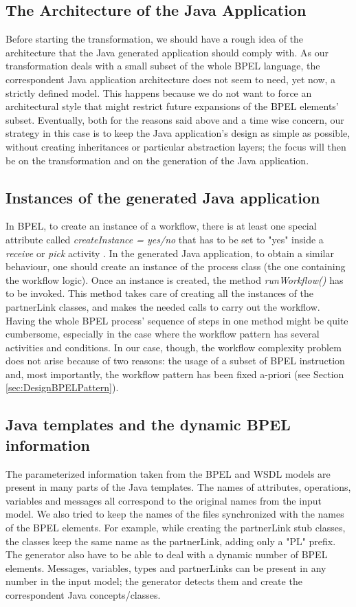 \subsection{The Architecture of the Java Application}
\label{sec:JavaArchitecStruct}
Before starting the transformation, we should have a rough idea of the architecture that the Java generated application should comply with.
As our transformation deals with a small subset of the whole BPEL language, the correspondent Java application architecture does not seem to need, yet now, a strictly defined model. This happens because we do not want to force an architectural style that might restrict future expansions of the BPEL elements' subset.
Eventually, both for the reasons said above and a time wise concern, our strategy in this case is to keep the Java application's design as simple as possible, without creating inheritances or particular abstraction layers; the focus will then be on the transformation and on the generation of the Java application.

\subsection{Instances of the generated Java application}
\label{sec:JavaAppRunnable}
In BPEL, to create an instance of a workflow, there is at least one special attribute called \textit{createInstance = yes/no} that has to be set to "yes" inside a \textit{receive} or \textit{pick} activity \cite{BPEL-oasis}. In the generated Java application, to obtain a similar behaviour, one should create an instance of the process class (the one containing the workflow logic). Once an instance is created, the method \textit{runWorkflow()} has to be invoked. This method takes care of creating all the instances of the partnerLink classes, and makes the needed calls to carry out the workflow.
Having the whole BPEL process' sequence of steps in one method might be quite cumbersome, especially in the case where the workflow pattern has several activities and conditions. In our case, though, the workflow complexity problem does not arise because of two reasons: the usage of a subset of BPEL instruction and, most importantly, the workflow pattern has been fixed a-priori (see Section \ref{sec:DesignBPELPattern}). 

\subsection{Java templates and the dynamic BPEL information}
\label{TemplatesDynamicInfos}
The parameterized information taken from the BPEL and WSDL models are present in many parts of the Java templates. The names of attributes, operations, variables and messages all correspond to the original names from the input model. 
We also tried to keep the names of the files synchronized with the names of the BPEL elements. For example, while creating the partnerLink stub classes, the classes keep the same name as the partnerLink, adding only a "PL" prefix. 
The generator also have to be able to deal with a dynamic number of BPEL elements. Messages, variables, types and  partnerLinks can be present in any number in the input model; the generator detects them and create the correspondent Java concepts/classes.


